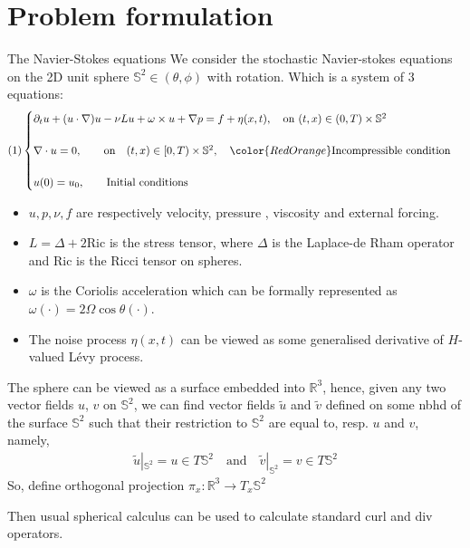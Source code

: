 \documentclass[xcolor=dvipsnames,leqno]{beamer}
\newcommand{\R}{\mathbb{R}}
\begin{document}
\section{Problem formulation}
\begin{frame}[shrink]{The Navier-Stokes equations}
 We consider the stochastic Navier-stokes equations on the 2D unit sphere $\mathbb{S}^2\in (\theta,\phi)$ with rotation. Which is a system of 3 equations:
	\begin{align*}(1)
		\begin{cases}
			\partial_t u+ (u\cdot\nabla)u-\nu L u+\omega\times u+\nabla p=f+\eta(x,t) ,\quad\text{on} \,\, (t, x)\in (0, T)\times\mathbb{S}^2\\
			&\\
			\nabla\cdot u=0,\qquad\text{on} \quad (t, x)\in[0, T)\times\mathbb{S}^2, \quad{\color{RedOrange}\text{Incompressible condition}}\\
			&\\
			u(0)=u_0, \qquad\text{Initial conditions}	
		\end{cases}	
	\end{align*}  
\begin{itemize}
	\item $u, p, \nu, f$ are respectively velocity, pressure , viscosity and external forcing.
	\item $L=\Delta + 2\text{Ric}$ is the stress tensor, where $\Delta$ is the Laplace-de Rham operator and $\text{Ric}$ is the Ricci tensor on spheres.
	\item $\omega$ is the Coriolis acceleration which can be formally represented as $\omega(\cdot) = 2\Omega\cos\theta(\cdot)$.
	\item The noise process $\eta(x,t)$ can be viewed as some generalised derivative of $H$-valued L\'evy process.
\end{itemize}
\end{frame}

\begin{frame}
	The sphere can be viewed as a surface embedded into $\R^3$, hence, given any two vector fields $u$, $v$ on $\mathbb{S}^2$, we can find vector fields $\tilde{u}$ and $\tilde{v}$ defined on some nbhd of the surface $\mathbb{S}^2$ such that their restriction to $\mathbb{S}^2$ are equal to, resp. $u$ and $v$, namely,
	\begin{align*}
		\tilde{u}|_{\mathbb{S}^2}=u\in T\mathbb{S}^2\quad\text{and}\quad\tilde{v}|_{\mathbb{S}^2}=v\in T\mathbb{S}^2 
	\end{align*}
So, define orthogonal projection $\pi_x:\R^3\to T_x \mathbb{S}^2$

Then usual spherical calculus can be used to calculate standard curl and div operators.
\end{frame}
\end{document}
